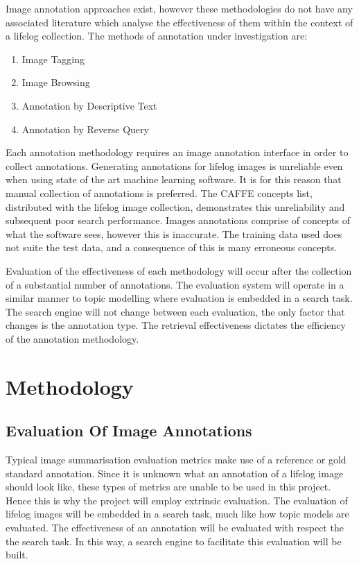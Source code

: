 \documentclass[12pt,a4paper]{article}
\begin{document}
Image annotation approaches exist, however these methodologies do not have any associated literature which analyse the effectiveness of them within the context of a lifelog collection. The methods of annotation under investigation are:
\begin{enumerate}
    \item Image Tagging
    \item Image Browsing
    \item Annotation by Descriptive Text
    \item Annotation by Reverse Query
\end{enumerate}
Each annotation methodology requires an image annotation interface in order to collect annotations. Generating annotations for lifelog images is unreliable even when using state of the art machine learning software. It is for this reason that manual collection of annotations is preferred. The CAFFE concepts list, distributed with the lifelog image collection, demonstrates this unreliability and subsequent poor search performance. Images annotations comprise of concepts of what the software sees, however this is inaccurate. The training data used does not suite the test data, and a consequence of this is many erroneous concepts.

Evaluation of the effectiveness of each methodology will occur after the collection of a substantial number of annotations. The evaluation system will operate in a similar manner to topic modelling where evaluation is embedded in a search task.  The search engine will not change between each evaluation, the only factor that changes is the annotation type. The retrieval effectiveness dictates the efficiency of the annotation methodology. 

\section{Methodology}
\subsection{Evaluation Of Image Annotations}
Typical image summarisation evaluation metrics make use of a reference or gold standard annotation. Since it is unknown what an annotation of a lifelog image should look like, these types of metrics are unable to be used in this project. Hence this is why the project will employ extrinsic evaluation. The evaluation of lifelog images will be embedded in a search task, much like how topic models are evaluated. The effectiveness of an annotation will be evaluated with respect the the search task. In this way, a search engine to facilitate this evaluation will be built.
\end{document}
